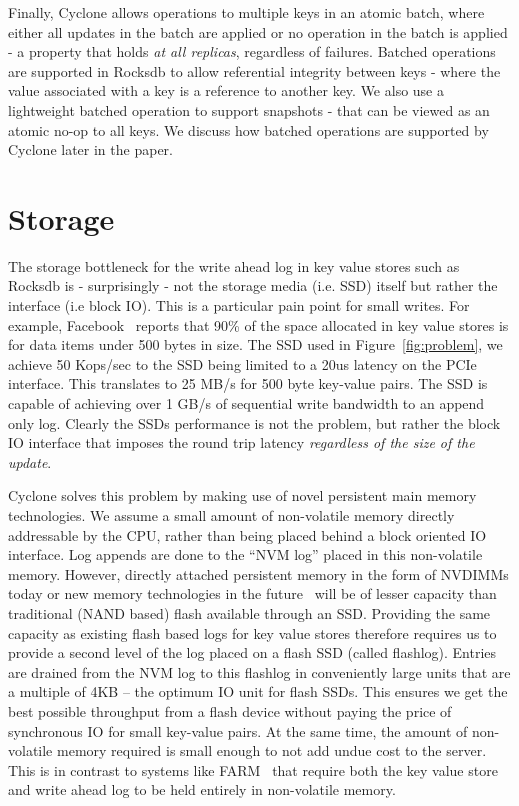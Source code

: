 \documentclass[letterpaper,twocolumn,10pt]{article}
\begin{document}
Finally, Cyclone allows operations to multiple keys in an atomic
batch, where either all updates in the batch are applied or no
operation in the batch is applied - a property that holds \emph{at all
  replicas}, regardless of failures. Batched operations are supported
in Rocksdb to allow referential integrity between keys - where the
value associated with a key is a reference to another key. We also use
a lightweight batched operation to support snapshots - that can be
viewed as an atomic no-op to all keys. We discuss how batched
operations are supported by Cyclone later in the paper.

\section{Storage}
\label{sec:storage}
The storage bottleneck for the write ahead log in key value stores
such as Rocksdb is - surprisingly - not the storage media (i.e. SSD)
itself but rather the interface (i.e block IO). This is a particular
pain point for small writes.  For example,
Facebook~\cite{fb_workload_analysis} reports that 90\% of the space
allocated in key value stores is for data items under 500 bytes in
size.  The SSD used in Figure~\ref{fig:problem}, we achieve 50
Kops/sec to the SSD being limited to a 20us latency on the PCIe
interface. This translates to 25 MB/s for 500 byte key-value
pairs. The SSD is capable of achieving over 1 GB/s of sequential write
bandwidth to an append only log. Clearly the SSDs performance is not
the problem, but rather the block IO interface that imposes the round
trip latency \emph{regardless of the size of the update}.

Cyclone solves this problem by making use of novel persistent main
memory technologies. We assume a small amount of non-volatile memory
directly addressable by the CPU, rather than being placed behind a
block oriented IO interface. Log appends are done to the ``NVM log''
placed in this non-volatile memory. However, directly attached
persistent memory in the form of NVDIMMs today or new memory
technologies in the future~\cite{pmfs} will be of lesser capacity than
traditional (NAND based) flash available through an SSD. Providing the
same capacity as existing flash based logs for key value stores
therefore requires us to provide a second level of the log placed on a
flash SSD (called flashlog).  Entries are drained from the NVM log to
this flashlog in conveniently large units that are a multiple of 4KB
-- the optimum IO unit for flash SSDs. This ensures we get the best
possible throughput from a flash device without paying the price of
synchronous IO for small key-value pairs. At the same time, the amount
of non-volatile memory required is small enough to not add undue cost
to the server. This is in contrast to systems like FARM~\cite{farm}
that require both the key value store and write ahead log to be held
entirely in non-volatile memory.
\end{document}
